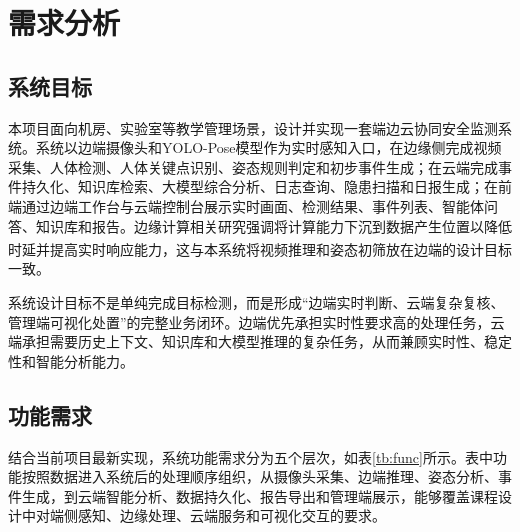 \newcommand{\upcite}[1]{\textsuperscript{\cite{#1}}}

\section{需求分析}

\subsection{系统目标}

本项目面向机房、实验室等教学管理场景，设计并实现一套端边云协同安全监测系统。系统以边端摄像头和YOLO-Pose模型作为实时感知入口，在边缘侧完成视频采集、人体检测、人体关键点识别、姿态规则判定和初步事件生成；在云端完成事件持久化、知识库检索、大模型综合分析、日志查询、隐患扫描和日报生成；在前端通过边端工作台与云端控制台展示实时画面、检测结果、事件列表、智能体问答、知识库和报告。边缘计算相关研究强调将计算能力下沉到数据产生位置以降低时延并提高实时响应能力\upcite{shi2017edge}，这与本系统将视频推理和姿态初筛放在边端的设计目标一致。

系统设计目标不是单纯完成目标检测，而是形成“边端实时判断、云端复杂复核、管理端可视化处置”的完整业务闭环。边端优先承担实时性要求高的处理任务，云端承担需要历史上下文、知识库和大模型推理的复杂任务，从而兼顾实时性、稳定性和智能分析能力。

\subsection{功能需求}

结合当前项目最新实现，系统功能需求分为五个层次，如表\ref{tb:func}所示。表中功能按照数据进入系统后的处理顺序组织，从摄像头采集、边端推理、姿态分析、事件生成，到云端智能分析、数据持久化、报告导出和管理端展示，能够覆盖课程设计中对端侧感知、边缘处理、云端服务和可视化交互的要求。

